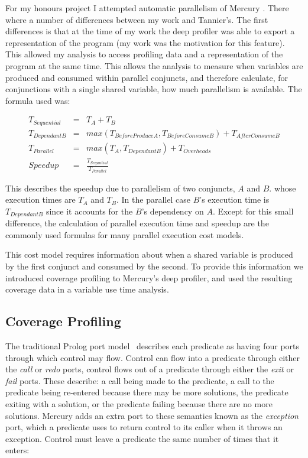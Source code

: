 For my honours project I attempted automatic parallelism of Mercury
\citep{paul_hons}.
There where a number of differences between my work and Tannier's.
The first differences is that at the time of my work the deep profiler
was able to export a representation of the program
(my work was the motivation for this feature).
This allowed my analysis to access profiling data and a representation
of the program at the same time.
This allows the analysis to measure when variables are produced and
consumed within parallel conjuncts,
and therefore calculate,
for conjunctions with a single shared variable,
how much parallelism is available.
The formula used was:

\begin{eqnarray*}
T_{Sequential} & = & T_A + T_B \\
T_{DependantB} & = & max(T_{BeforeProduceA}, T_{BeforeConsumeB}) +
T_{AfterConsumeB} \\
T_{Parallel} & = & max(T_A, T_{DependantB}) + T_{Overheads} \\
Speedup & = & \frac{T_{Sequntial}}{T_{Parallel}}
\end{eqnarray*}

This describes the speedup due to parallelism of two conjuncts, $A$ and $B$.
whose execution times are $T_A$ and $T_B$.
In the parallel case $B$'s execution time is $T_{DependantB}$ since it
accounts for the $B$'s dependency on $A$.
Except for this small difference,
the calculation of parallel execution time and speedup are the commonly
used formulas for many parallel execution cost models.

This cost model requires information about when a shared variable is
produced by the first conjunct and consumed by the second.
To provide this information we introduced coverage profiling to
Mercury's deep profiler,
and used the resulting coverage data in a variable use time analysis.

\subsection{Coverage Profiling}
\label{sec:coverage}

The traditional Prolog port model~\cite{port_model} describes each predicate as
having four ports through which control may flow.
Control can flow into a predicate through either the \emph{call} or
\emph{redo} ports,
control flows out of a predicate through either the \emph{exit} or
\emph{fail} ports.
These describe:
    a call being made to the predicate,
    a call to the predicate being re-entered because there may be more
    solutions,
    the predicate exiting with a solution,
    or the predicate failing because there are no more solutions.
Mercury adds an extra port to these semantics known as the
\emph{exception} port,
which a predicate uses to return control to its caller when it throws an
exception.
Control must leave a predicate the same number of times that it enters:

